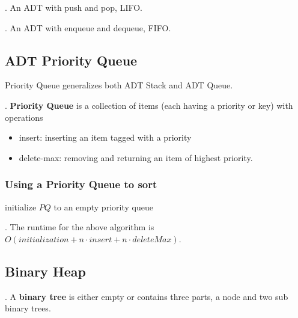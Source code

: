\documentclass{article}
\begin{document}
\begin{deff}.
    An ADT with push and pop, LIFO. 
\end{deff}

\begin{deff}.
    An ADT with enqueue and dequeue, FIFO. 
\end{deff}

\subsection{ADT Priority Queue}

Priority Queue generalizes both ADT Stack and ADT Queue. 

\begin{deff}.
    \textbf{Priority Queue} is a collection of items (each having a priority or key) with operations \begin{itemize}
        \item insert: inserting an item tagged with a priority 
        \item delete-max: removing and returning an item of highest priority.
    \end{itemize}
\end{deff}

\subsubsection{Using a Priority Queue to sort}

\begin{algorithm}[H] 
    initialize $PQ$ to an empty priority queue \;
\end{algorithm}

\begin{comm}[].
    The runtime for the above algorithm is $O(initialization + n \cdot insert + n \cdot deleteMax)$. 
\end{comm}

\subsection{Binary Heap}

\begin{deff}.
    A \textbf{binary tree} is either empty or contains three parts, a node and two sub binary trees. 
\end{deff}
\end{document}
